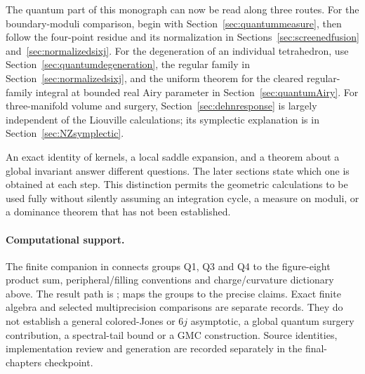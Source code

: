 The quantum part of this monograph can now be read along three routes.
For the boundary-moduli comparison, begin with
Section~\ref{sec:quantummeasure}, then follow the four-point residue
and its normalization in Sections~\ref{sec:screenedfusion}
and~\ref{sec:normalizedsixj}. For the degeneration of an individual
tetrahedron, use Section~\ref{sec:quantumdegeneration}, the regular
family in Section~\ref{sec:normalizedsixj}, and the uniform theorem for the cleared regular-family integral
at bounded real Airy parameter in Section~\ref{sec:quantumAiry}. For three-manifold volume
and surgery, Section~\ref{sec:dehnresponse} is largely independent
of the Liouville calculations; its symplectic explanation is in
Section~\ref{sec:NZsymplectic}.

An exact identity of kernels, a local saddle expansion, and a
theorem about a global invariant answer different questions. The
later sections state which one is obtained at each step. This
distinction permits the geometric calculations to be used fully
without silently assuming an integration cycle, a measure on
moduli, or a dominance theorem that has not been established.

\paragraph{Computational support.}
The finite companion in 
connects groups Q1, Q3 and Q4 to the figure-eight product sum,
peripheral/filling conventions and charge/curvature dictionary above.
The result path is ;
 maps the groups to the precise claims.
Exact finite algebra and selected multiprecision comparisons are separate
records. They do not establish a general colored-Jones or $6j$ asymptotic,
a global quantum surgery contribution, a spectral-tail bound or a GMC
construction. Source identities, implementation review and generation
are recorded separately in the final-chapters checkpoint.
